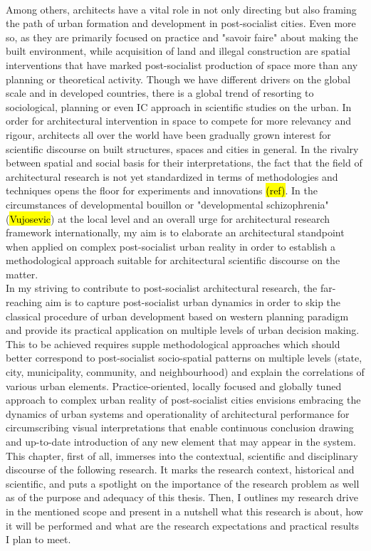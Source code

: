 \documentclass[11pt]{report}
\begin{document}
\\
Among others, architects have a vital role in not only directing but also framing the path of urban formation and development in post-socialist cities. Even more so, as they are primarily focused on practice and "savoir faire" about making the built environment, while acquisition of land and illegal construction are spatial interventions that have marked post-socialist production of space more than any planning or theoretical activity. Though we have different drivers on the global scale and in developed countries, there is a global trend of resorting to sociological, planning or even IC approach in scientific studies on the urban. 
In order for architectural intervention in space to compete for more relevancy and rigour,  architects all over the world have been gradually grown interest for scientific discourse on built structures, spaces and cities in general.  In the rivalry between spatial and social basis for their interpretations, the fact that the field of architectural research is not yet standardized in terms of methodologies and techniques opens the floor for experiments and innovations \hl{(ref)}. In the circumstances of developmental bouillon or "developmental schizophrenia"(\hl{Vujosevic}) at the local level and an overall urge for architectural research framework internationally, my aim is to elaborate an architectural standpoint when applied on complex post-socialist urban reality in order to establish a methodological approach suitable for architectural scientific discourse on the matter.
\\
In my striving to contribute to post-socialist architectural research, the far-reaching aim is to capture post-socialist urban dynamics  in order to skip the classical procedure of urban development based on western planning paradigm and provide its practical application on multiple levels of urban decision making. This to be achieved requires supple methodological approaches which should better correspond to post-socialist socio-spatial patterns on multiple levels (state, city, municipality, community, and neighbourhood) and explain the correlations of various urban elements. Practice-oriented, locally focused and globally tuned  approach to complex urban reality of post-socialist cities envisions embracing the dynamics of urban systems and operationality of architectural performance for circumscribing visual interpretations that enable continuous conclusion drawing and up-to-date introduction of any new element that may appear in the system.
\\
This chapter, first of all, immerses into the contextual, scientific and disciplinary discourse of the following research. It marks the research context, historical and scientific, and puts a spotlight on the importance of the research problem as well as of the purpose and adequacy of this thesis. Then, I outlines my research drive in the mentioned scope and present in a nutshell what this research is about, how it will be performed and what are the research expectations and practical results I plan to meet. 
\end{document}
